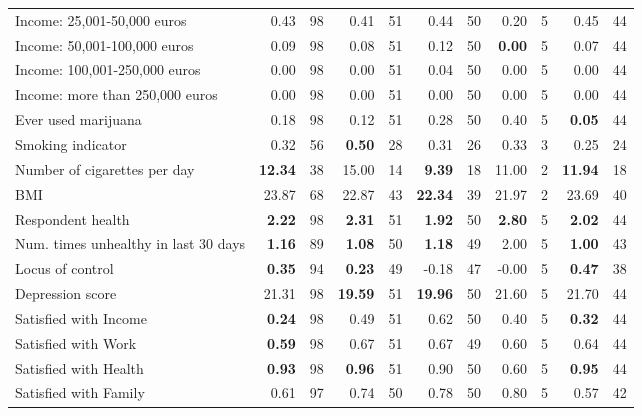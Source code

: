 \begin{tabular}{l r r r r r r r r r r}
Income: 25,001-50,000 euros &      0.43 &        98 &      0.41 &        51 &      0.44 &        50 &      0.20 &         5 &      0.45 &        44 \\
Income: 50,001-100,000 euros &      0.09 &        98 &      0.08 &        51 &      0.12 &        50 & \textbf{     0.00} &         5 &      0.07 &        44 \\
Income: 100,001-250,000 euros &      0.00 &        98 &      0.00 &        51 &      0.04 &        50 &      0.00 &         5 &      0.00 &        44 \\
Income: more than 250,000 euros &      0.00 &        98 &      0.00 &        51 &      0.00 &        50 &      0.00 &         5 &      0.00 &        44 \\
Ever used marijuana &      0.18 &        98 &      0.12 &        51 &      0.28 &        50 &      0.40 &         5 & \textbf{     0.05} &        44 \\
Smoking indicator &      0.32 &        56 & \textbf{     0.50} &        28 &      0.31 &        26 &      0.33 &         3 &      0.25 &        24 \\
Number of cigarettes per day & \textbf{    12.34} &        38 &     15.00 &        14 & \textbf{     9.39} &        18 &     11.00 &         2 & \textbf{    11.94} &        18 \\
BMI &     23.87 &        68 &     22.87 &        43 & \textbf{    22.34} &        39 &     21.97 &         2 &     23.69 &        40 \\
Respondent health & \textbf{     2.22} &        98 & \textbf{     2.31} &        51 & \textbf{     1.92} &        50 & \textbf{     2.80} &         5 & \textbf{     2.02} &        44 \\
Num. times unhealthy in last 30 days & \textbf{     1.16} &        89 & \textbf{     1.08} &        50 & \textbf{     1.18} &        49 &      2.00 &         5 & \textbf{     1.00} &        43 \\
Locus of control & \textbf{     0.35} &        94 & \textbf{     0.23} &        49 &     -0.18 &        47 &     -0.00 &         5 & \textbf{     0.47} &        38 \\
Depression score &     21.31 &        98 & \textbf{    19.59} &        51 & \textbf{    19.96} &        50 &     21.60 &         5 &     21.70 &        44 \\
Satisfied with Income & \textbf{     0.24} &        98 &      0.49 &        51 &      0.62 &        50 &      0.40 &         5 & \textbf{     0.32} &        44 \\
Satisfied with Work & \textbf{     0.59} &        98 &      0.67 &        51 &      0.67 &        49 &      0.60 &         5 &      0.64 &        44 \\
Satisfied with Health & \textbf{     0.93} &        98 & \textbf{     0.96} &        51 &      0.90 &        50 &      0.60 &         5 & \textbf{     0.95} &        44 \\
Satisfied with Family &      0.61 &        97 &      0.74 &        50 &      0.78 &        50 &      0.80 &         5 &      0.57 &        42 \\
\bottomrule
\end{tabular}
